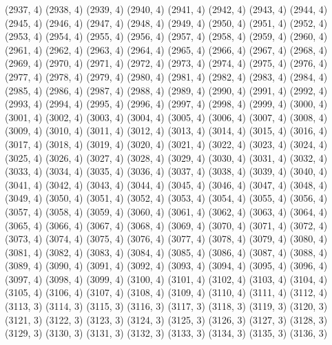 {   (2937, 4)
   (2938, 4)
   (2939, 4)
   (2940, 4)
   (2941, 4)
   (2942, 4)
   (2943, 4)
   (2944, 4)
   (2945, 4)
   (2946, 4)
   (2947, 4)
   (2948, 4)
   (2949, 4)
   (2950, 4)
   (2951, 4)
   (2952, 4)
   (2953, 4)
   (2954, 4)
   (2955, 4)
   (2956, 4)
   (2957, 4)
   (2958, 4)
   (2959, 4)
   (2960, 4)
   (2961, 4)
   (2962, 4)
   (2963, 4)
   (2964, 4)
   (2965, 4)
   (2966, 4)
   (2967, 4)
   (2968, 4)
   (2969, 4)
   (2970, 4)
   (2971, 4)
   (2972, 4)
   (2973, 4)
   (2974, 4)
   (2975, 4)
   (2976, 4)
   (2977, 4)
   (2978, 4)
   (2979, 4)
   (2980, 4)
   (2981, 4)
   (2982, 4)
   (2983, 4)
   (2984, 4)
   (2985, 4)
   (2986, 4)
   (2987, 4)
   (2988, 4)
   (2989, 4)
   (2990, 4)
   (2991, 4)
   (2992, 4)
   (2993, 4)
   (2994, 4)
   (2995, 4)
   (2996, 4)
   (2997, 4)
   (2998, 4)
   (2999, 4)
   (3000, 4)
   (3001, 4)
   (3002, 4)
   (3003, 4)
   (3004, 4)
   (3005, 4)
   (3006, 4)
   (3007, 4)
   (3008, 4)
   (3009, 4)
   (3010, 4)
   (3011, 4)
   (3012, 4)
   (3013, 4)
   (3014, 4)
   (3015, 4)
   (3016, 4)
   (3017, 4)
   (3018, 4)
   (3019, 4)
   (3020, 4)
   (3021, 4)
   (3022, 4)
   (3023, 4)
   (3024, 4)
   (3025, 4)
   (3026, 4)
   (3027, 4)
   (3028, 4)
   (3029, 4)
   (3030, 4)
   (3031, 4)
   (3032, 4)
   (3033, 4)
   (3034, 4)
   (3035, 4)
   (3036, 4)
   (3037, 4)
   (3038, 4)
   (3039, 4)
   (3040, 4)
   (3041, 4)
   (3042, 4)
   (3043, 4)
   (3044, 4)
   (3045, 4)
   (3046, 4)
   (3047, 4)
   (3048, 4)
   (3049, 4)
   (3050, 4)
   (3051, 4)
   (3052, 4)
   (3053, 4)
   (3054, 4)
   (3055, 4)
   (3056, 4)
   (3057, 4)
   (3058, 4)
   (3059, 4)
   (3060, 4)
   (3061, 4)
   (3062, 4)
   (3063, 4)
   (3064, 4)
   (3065, 4)
   (3066, 4)
   (3067, 4)
   (3068, 4)
   (3069, 4)
   (3070, 4)
   (3071, 4)
   (3072, 4)
   (3073, 4)
   (3074, 4)
   (3075, 4)
   (3076, 4)
   (3077, 4)
   (3078, 4)
   (3079, 4)
   (3080, 4)
   (3081, 4)
   (3082, 4)
   (3083, 4)
   (3084, 4)
   (3085, 4)
   (3086, 4)
   (3087, 4)
   (3088, 4)
   (3089, 4)
   (3090, 4)
   (3091, 4)
   (3092, 4)
   (3093, 4)
   (3094, 4)
   (3095, 4)
   (3096, 4)
   (3097, 4)
   (3098, 4)
   (3099, 4)
   (3100, 4)
   (3101, 4)
   (3102, 4)
   (3103, 4)
   (3104, 4)
   (3105, 4)
   (3106, 4)
   (3107, 4)
   (3108, 4)
   (3109, 4)
   (3110, 4)
   (3111, 4)
   (3112, 4)
   (3113, 3)
   (3114, 3)
   (3115, 3)
   (3116, 3)
   (3117, 3)
   (3118, 3)
   (3119, 3)
   (3120, 3)
   (3121, 3)
   (3122, 3)
   (3123, 3)
   (3124, 3)
   (3125, 3)
   (3126, 3)
   (3127, 3)
   (3128, 3)
   (3129, 3)
   (3130, 3)
   (3131, 3)
   (3132, 3)
   (3133, 3)
   (3134, 3)
   (3135, 3)
   (3136, 3)
}
